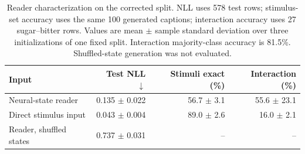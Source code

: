 \begin{table}[t]
\caption{Reader characterization on the corrected split. NLL uses 578 test rows; stimulus-set accuracy uses the same 100 generated captions; interaction accuracy uses 27 sugar--bitter rows. Values are mean $\pm$ sample standard deviation over three initializations of one fixed split. Interaction majority-class accuracy is 81.5\%. Shuffled-state generation was not evaluated.}
\label{tab:reader}
\centering\small
\begin{tabular}{@{}lrrr@{}}
\toprule
Input & Test NLL $\downarrow$ & Stimuli exact (\%) & Interaction (\%) \\
\midrule
Neural-state reader & 0.135 $\pm$ 0.022 & 56.7 $\pm$ 3.1 & 55.6 $\pm$ 23.1 \\
Direct stimulus input & 0.043 $\pm$ 0.004 & 89.0 $\pm$ 2.6 & 16.0 $\pm$ 2.1 \\
Reader, shuffled states & 0.737 $\pm$ 0.031 & -- & -- \\
\bottomrule
\end{tabular}
\end{table}

